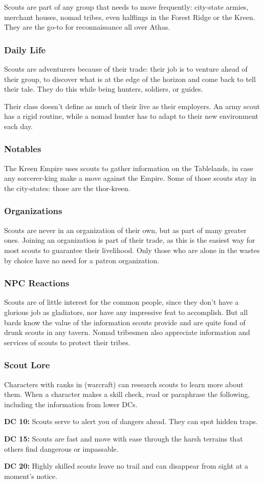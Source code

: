 Scouts are part of any group that needs to move frequently: city-state armies, merchant houses, nomad tribes, even halflings in the Forest Ridge or the Kreen. They are the go-to for reconnaissance all over Athas.

\subsubsection{Daily Life}
Scouts are adventurers because of their trade: their job is to venture ahead of their group, to discover what is at the edge of the horizon and come back to tell their tale. They do this while being hunters, soldiers, or guides.

Their class doesn't define as much of their live as their employers. An army scout has a rigid routine, while a nomad hunter has to adapt to their new environment each day.

\subsubsection{Notables}
The Kreen Empire uses scouts to gather information on the Tablelands, in case any sorcerer-king make a move against the Empire. Some of those scouts stay in the city-states: those are the thor-kreen.

\subsubsection{Organizations}
Scouts are never in an organization of their own, but as part of many greater ones. Joining an organization is part of their trade, as this is the easiest way for most scouts to guarantee their livelihood. Only those who are alone in the wastes by choice have no need for a patron organization.

\subsubsection{NPC Reactions}
Scouts are of little interest for the common people, since they don't have a glorious job as gladiators, nor have any impressive feat to accomplish. But all bards know the value of the information scouts provide and are quite fond of drunk scouts in any tavern. Nomad tribesmen also appreciate information and services of scouts to protect their tribes.

\subsubsection{Scout Lore}
Characters with ranks in  (warcraft) can research scouts to learn more about them. When a character makes a skill check, read or paraphrase the following, including the information from lower DCs.

\textbf{DC 10:} Scouts serve to alert you of dangers ahead. They can spot hidden traps.

\textbf{DC 15:} Scouts are fast and move with ease through the harsh terrains that others find dangerous or impassable.

\textbf{DC 20:} Highly skilled scouts leave no trail and can disappear from sight at a moment's notice.
